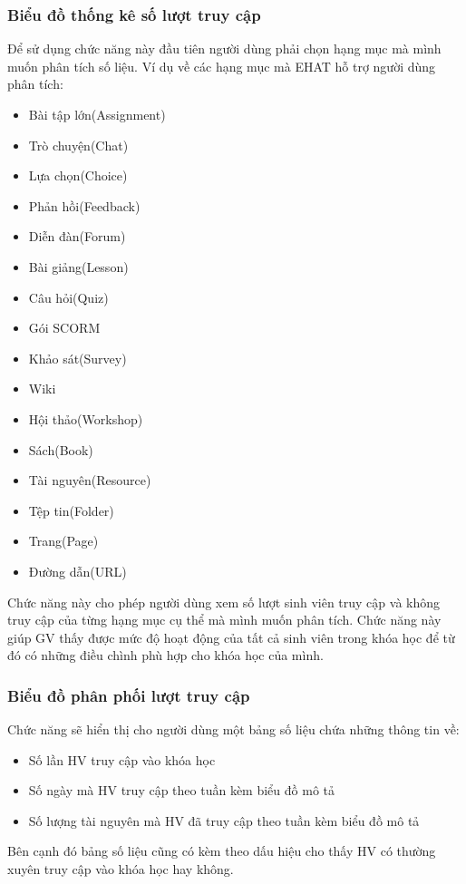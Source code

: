 \subsubsection{Biểu đồ thống kê số lượt truy cập}
Để sử dụng chức năng này đầu tiên người dùng phải chọn hạng mục mà mình muốn phân tích số liệu. Ví dụ về các hạng mục mà EHAT hỗ trợ người dùng phân tích:
\begin{itemize}
	\item Bài tập lớn(Assignment)
	\item Trò chuyện(Chat)
	\item Lựa chọn(Choice)
	\item Phản hồi(Feedback)
	\item Diễn đàn(Forum)
	\item Bài giảng(Lesson)
	\item Câu hỏi(Quiz)
	\item Gói SCORM
	\item Khảo sát(Survey)
	\item Wiki
	\item Hội thảo(Workshop)
	\item Sách(Book)
	\item Tài nguyên(Resource)
	\item Tệp tin(Folder)
	\item Trang(Page)
	\item Đường dẫn(URL)
\end{itemize}

Chức năng này cho phép người dùng xem số lượt sinh viên truy cập và không truy cập của từng hạng mục cụ thể mà mình muốn phân tích. Chức năng này giúp GV thấy được mức độ hoạt động của tất cả sinh viên trong khóa học để từ đó có những điều chình phù hợp cho khóa học của mình.

\subsubsection{Biểu đồ phân phối lượt truy cập}
Chức năng sẽ hiển thị cho người dùng một bảng số liệu chứa những thông tin về:
\begin{itemize}
	\item Số lần HV truy cập vào khóa học
	\item Số ngày mà HV truy cập theo tuần kèm biểu đồ mô tả
	\item Số lượng tài nguyên mà HV đã truy cập theo tuần kèm biểu đồ mô tả
\end{itemize}
Bên cạnh đó bảng số liệu cũng có kèm theo dấu hiệu cho thấy HV có thường xuyên truy cập vào khóa học hay không.

